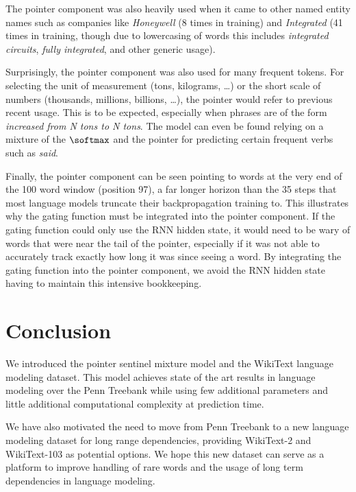 The pointer component was also heavily used when it came to other named entity names such as companies like \emph{Honeywell} (8 times in training) and \emph{Integrated} (41 times in training, though due to lowercasing of words this includes \emph{integrated circuits}, \emph{fully integrated}, and other generic usage).

Surprisingly, the pointer component was also used for many frequent tokens. For selecting the unit of measurement (tons, kilograms, \ldots) or the short scale of numbers (thousands, millions, billions, \ldots), the pointer would refer to previous recent usage. This is to be expected, especially when phrases are of the form \emph{increased from N tons to N tons}. The model can even be found relying on a mixture of the $\softmax$ and the pointer for predicting certain frequent verbs such as \textit{said}.

Finally, the pointer component can be seen pointing to words at the very end of the 100 word window (position 97), a far longer horizon than the 35 steps that most language models truncate their backpropagation training to. This illustrates why the gating function must be integrated into the pointer component. If the gating function could only use the RNN hidden state, it would need to be wary of words that were near the tail of the pointer, especially if it was not able to accurately track exactly how long it was since seeing a word. By integrating the gating function into the pointer component, we avoid the RNN hidden state having to maintain this intensive bookkeeping.

\section{Conclusion}
We introduced the pointer sentinel mixture model and the WikiText language modeling dataset. This model achieves state of the art results in language modeling over the Penn Treebank while using few additional parameters and little additional computational complexity at prediction time.

We have also motivated the need to move from Penn Treebank to a new language modeling dataset for long range dependencies, providing WikiText-2 and WikiText-103 as potential options. We hope this new dataset can serve as a platform to improve handling of rare words and the usage of long term dependencies in language modeling.


